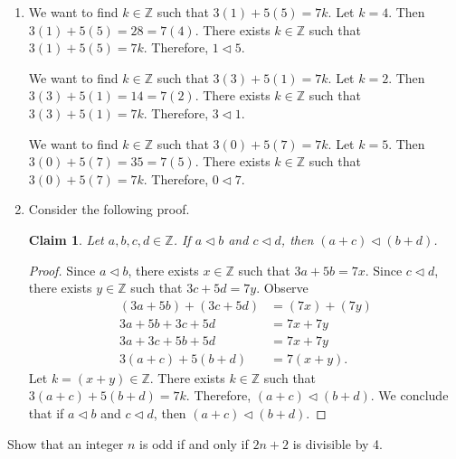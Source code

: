 \documentclass{article}
\newtheorem*{claim}{Claim}
\theoremstyle{definition}
\begin{document}
\begin{solution}
\begin{enumerate}
\item We want to find $k\in\mathbb{Z}$ such that $3(1)+5(5)=7k$. Let $k=4$. Then $3(1)+5(5)=28=7(4)$. There exists $k\in\mathbb{Z}$ such that $3(1)+5(5)=7k$. Therefore, $1\triangleleft 5$.

We want to find $k\in\mathbb{Z}$ such that $3(3)+5(1)=7k$. Let $k=2$. Then $3(3)+5(1)=14=7(2)$. There exists $k\in\mathbb{Z}$ such that $3(3)+5(1)=7k$. Therefore, $3\triangleleft 1$.

We want to find $k\in\mathbb{Z}$ such that $3(0)+5(7)=7k$. Let $k=5$. Then $3(0)+5(7)=35=7(5)$. There exists $k\in\mathbb{Z}$ such that $3(0)+5(7)=7k$. Therefore, $0\triangleleft 7$.
\item Consider the following proof.\begin{claim}
Let $a,b,c,d\in\mathbb{Z}$. If $a\triangleleft b$ and $c\triangleleft d$, then $(a+c)\triangleleft(b+d)$.
\end{claim}\begin{proof}
Since $a\triangleleft b$, there exists $x\in\mathbb{Z}$ such that $3a+5b=7x$. Since $c\triangleleft d$, there exists $y\in\mathbb{Z}$ such that $3c+5d=7y$. Observe
\begin{align}
(3a+5b)+(3c+5d)&=(7x)+(7y)\\
3a+5b+3c+5d&=7x+7y\\
3a+3c+5b+5d&=7x+7y\\
3(a+c)+5(b+d)&=7(x+y).
\end{align}
Let $k=(x+y)\in\mathbb{Z}$. There exists $k\in\mathbb{Z}$ such that $3(a+c)+5(b+d)=7k$. Therefore, $(a+c)\triangleleft(b+d)$. We conclude that if $a\triangleleft b$ and $c\triangleleft d$, then $(a+c)\triangleleft(b+d)$.
\end{proof}
\end{enumerate}
\end{solution}
\begin{question}
    Show that an integer $n$ is odd if and only if $2n+2$ is divisible by 4.
\end{question}
\end{document}
